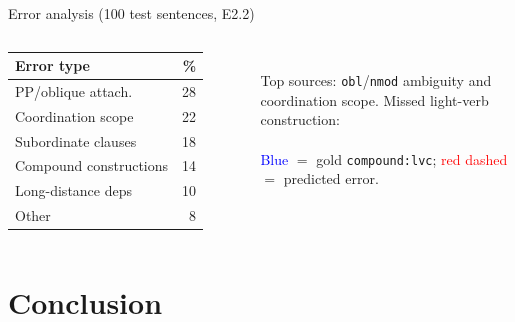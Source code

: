 \documentclass{beamer}
\begin{document}
\begin{frame}{Error analysis (100 test sentences, E2.2)}
\begin{columns}[T]
\scriptsize
\begin{tabular}{lr}
\toprule
Error type & \% \\
\midrule
PP/oblique attach.\     & 28 \\
Coordination scope      & 22 \\
Subordinate clauses     & 18 \\
Compound constructions  & 14 \\
Long-distance deps      & 10 \\
Other                   &  8 \\
\bottomrule
\end{tabular}
\vspace{0.2cm}\\
Top sources: \texttt{obl}/\texttt{nmod} ambiguity and coordination scope.
\centering\scriptsize Missed light-verb construction:\\[4pt]
\\[4pt]
\scriptsize
\textcolor{blue}{Blue} $=$ gold \texttt{compound:lvc};
\textcolor{red}{red dashed} $=$ predicted error.
\end{columns}
\end{frame}

\section{Conclusion}
\end{document}
